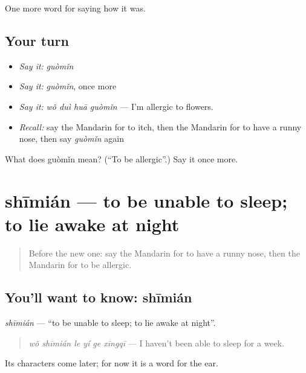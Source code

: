 \begin{grammarlens}[title={What you've built}]
One more word for saying how it was.
\end{grammarlens}

\subsection*{Your turn}
\begin{itemize}
\raggedright
  \item \emph{Say it:} \emph{guòmǐn}
  \item \emph{Say it:} \emph{guòmǐn}, once more
  \item \emph{Say it:} \emph{wǒ duì huā guòmǐn} — I'm allergic to flowers.
  \item \emph{Recall:} say the Mandarin for to itch, then the Mandarin for to have a runny nose, then say \emph{guòmǐn} again
\end{itemize}

\begin{tcolorbox}[breakable,colback=teal!4,colframe=teal!35!black,title={Before you move on}]
What does guòmǐn mean? (\textquotedblleft{}To be allergic\textquotedblright{}.) Say it once more.
\end{tcolorbox}
\section[shīmián]{shīmián — to be unable to sleep; to lie awake at night}

\label{lesson:ZH-C480-shimian}



\begin{quote}
Before the new one: say the Mandarin for to have a runny nose, then the Mandarin for to be allergic.
\end{quote}

\subsection*{You'll want to know: shīmián}
\emph{shīmián} — \textquotedblleft{}to be unable to sleep; to lie awake at night\textquotedblright{}.

\begin{quote}
\emph{wǒ shīmián le yí ge xīngqī} — I haven't been able to sleep for a week.
\end{quote}

Its characters come later; for now it is a word for the ear.

